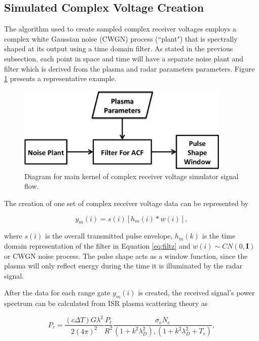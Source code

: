\documentclass[draft,ras]{agutex}
\begin{document}
\begin{article}
\subsection{Simulated Complex Voltage Creation}

The algorithm used to create sampled complex receiver voltages employs a complex white Gaussian noise (CWGN) process (``plant") that is spectrally shaped at its output using a time domain filter. As stated in the previous subsection, each point in space and time will have a separate noise plant and filter which is derived from the plasma and radar parameters parameters. Figure \ref{fig:IQdiagram} presents a representative example. 

\begin{figure}[h!]
\centering
\includegraphics[width=4in]{diagrampart}
\caption{Diagram for main kernel of complex receiver voltage simulator signal flow.}
\label{fig:IQdiagram}
\end{figure}

The creation of one set of complex receiver voltage data can be represented by

\begin{equation}
\label{eq2}
y_m (i)= s(i)\left[h_m(i)*w(i)\right],
\end{equation}
 
\noindent where $s(i)$ is the overall transmitted pulse envelope, $h_m(k)$ is the time domain representation of the filter in Equation \ref{eq:filtz} and $w(i)\sim CN(0,\mathbf{I})$ or CWGN noise process. The pulse shape acts as a window function, since the plasma will only reflect energy during the time it is illuminated by the radar signal. 



After the data for each range gate $y_m(i)$ is created, the received signal's power spectrum can be calculated from ISR plasma scattering theory as 

\begin{equation}
\label{eq3}
P_r = \frac{\left(c\Delta T\right) G \lambda^2}{2(4\pi)^2}\frac{P_t }{R^2}\frac{\sigma_e N_e}{(1+k^2\lambda_D^2),(1+k^2\lambda_D^2 + T_r)},
\end{equation}
 

\end{article}
\end{document}
